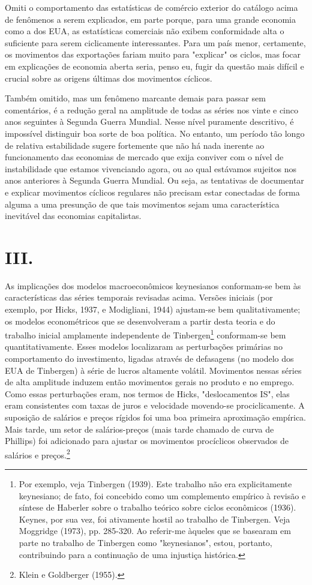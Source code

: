 \documentclass[12pt]{article}
\begin{document}
Omiti o comportamento das estatísticas de comércio exterior do catálogo acima de fenômenos a serem explicados, em parte porque, para uma grande economia como a dos EUA, as estatísticas comerciais não exibem conformidade alta o suficiente para serem ciclicamente interessantes. Para um país menor, certamente, os movimentos das exportações fariam muito para "explicar" os ciclos, mas focar em explicações de economia aberta seria, penso eu, fugir da questão mais difícil e crucial sobre as origens últimas dos movimentos cíclicos.

Também omitido, mas um fenômeno marcante demais para passar sem comentários, é a redução geral na amplitude de todas as séries nos vinte e cinco anos seguintes à Segunda Guerra Mundial. Nesse nível puramente descritivo, é impossível distinguir boa sorte de boa política. No entanto, um período tão longo de relativa estabilidade sugere fortemente que não há nada inerente ao funcionamento das economias de mercado que exija conviver com o nível de instabilidade que estamos vivenciando agora, ou ao qual estávamos sujeitos nos anos anteriores à Segunda Guerra Mundial. Ou seja, as tentativas de documentar e explicar movimentos cíclicos regulares não precisam estar conectadas de forma alguma a uma presunção de que tais movimentos sejam uma característica inevitável das economias capitalistas.

\section*{III.}

As implicações dos modelos macroeconômicos keynesianos conformam-se bem às características das séries temporais revisadas acima. Versões iniciais (por exemplo, por Hicks, 1937, e Modigliani, 1944) ajustam-se bem qualitativamente; os modelos econométricos que se desenvolveram a partir desta teoria e do trabalho inicial amplamente independente de Tinbergen\footnote{Por exemplo, veja Tinbergen (1939). Este trabalho não era explicitamente keynesiano; de fato, foi concebido como um complemento empírico à revisão e síntese de Haberler sobre o trabalho teórico sobre ciclos econômicos (1936). Keynes, por sua vez, foi ativamente hostil ao trabalho de Tinbergen. Veja Moggridge (1973), pp. 285-320. Ao referir-me àqueles que se basearam em parte no trabalho de Tinbergen como "keynesianos", estou, portanto, contribuindo para a continuação de uma injustiça histórica.} conformam-se bem quantitativamente. Esses modelos localizaram as perturbações primárias no comportamento do investimento, ligadas através de defasagens (no modelo dos EUA de Tinbergen) à série de lucros altamente volátil. Movimentos nessas séries de alta amplitude induzem então movimentos gerais no produto e no emprego. Como essas perturbações eram, nos termos de Hicks, "deslocamentos IS", elas eram consistentes com taxas de juros e velocidade movendo-se prociclicamente. A suposição de salários e preços rígidos foi uma boa primeira aproximação empírica. Mais tarde, um setor de salários-preços (mais tarde chamado de curva de Phillips) foi adicionado para ajustar os movimentos procíclicos observados de salários e preços.\footnote{Klein e Goldberger (1955).}
\end{document}
